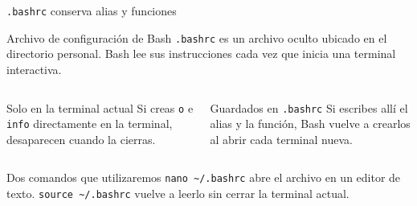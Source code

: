 \documentclass[aspectratio=169,10pt,c]{beamer}
\begin{document}
\begin{frame}{\texttt{.bashrc} conserva alias y funciones}
\begin{block}{Archivo de configuración de Bash}
\small \texttt{.bashrc} es un archivo oculto ubicado en el directorio personal. Bash lee sus instrucciones cada vez que inicia una terminal interactiva.
\end{block}
\begin{columns}[T,onlytextwidth]
\begin{exampleblock}{Solo en la terminal actual}
\small Si creas \texttt{o} e \texttt{info} directamente en la terminal, desaparecen cuando la cierras.
\end{exampleblock}
\begin{exampleblock}{Guardados en \texttt{.bashrc}}
\small Si escribes allí el alias y la función, Bash vuelve a crearlos al abrir cada terminal nueva.
\end{exampleblock}
\end{columns}
\begin{alertblock}{Dos comandos que utilizaremos}
\small \texttt{nano \textasciitilde/.bashrc} abre el archivo en un editor de texto. \texttt{source \textasciitilde/.bashrc} vuelve a leerlo sin cerrar la terminal actual.
\end{alertblock}
\end{frame}
\end{document}
